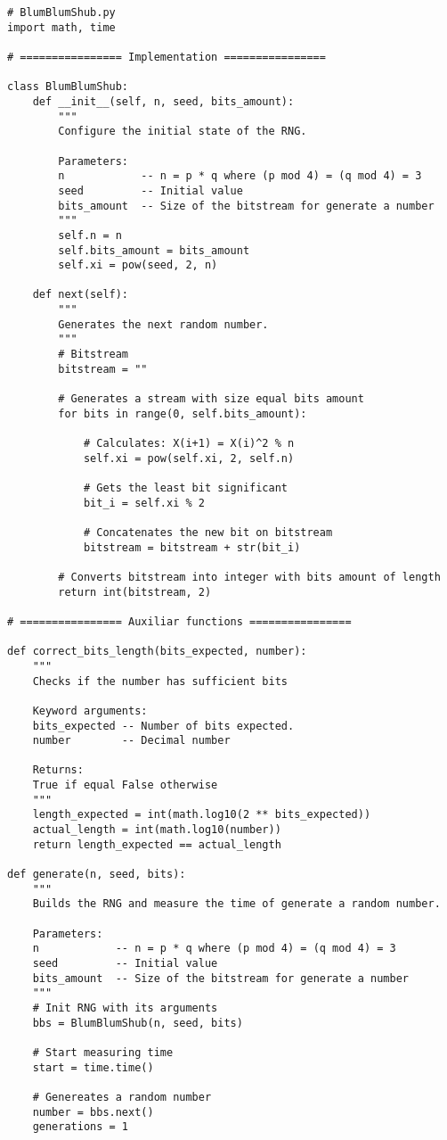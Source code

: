 \documentclass{article}
\begin{document}
\begin{lstlisting}
# BlumBlumShub.py
import math, time

# ================ Implementation ================

class BlumBlumShub:
	def __init__(self, n, seed, bits_amount):
		"""
		Configure the initial state of the RNG.

		Parameters:
		n            -- n = p * q where (p mod 4) = (q mod 4) = 3
		seed         -- Initial value
		bits_amount  -- Size of the bitstream for generate a number
		"""
		self.n = n
		self.bits_amount = bits_amount
		self.xi = pow(seed, 2, n)

	def next(self):
		"""
		Generates the next random number.
		"""
		# Bitstream
		bitstream = ""

		# Generates a stream with size equal bits amount
		for bits in range(0, self.bits_amount):

			# Calculates: X(i+1) = X(i)^2 % n
			self.xi = pow(self.xi, 2, self.n)

			# Gets the least bit significant
			bit_i = self.xi % 2

			# Concatenates the new bit on bitstream
			bitstream = bitstream + str(bit_i)
		
		# Converts bitstream into integer with bits amount of length
		return int(bitstream, 2)

# ================ Auxiliar functions ================

def correct_bits_length(bits_expected, number):
	"""
	Checks if the number has sufficient bits

	Keyword arguments:
	bits_expected -- Number of bits expected. 
	number        -- Decimal number

	Returns:
	True if equal False otherwise
	"""
	length_expected = int(math.log10(2 ** bits_expected))
	actual_length = int(math.log10(number))
	return length_expected == actual_length

def generate(n, seed, bits):
	"""
	Builds the RNG and measure the time of generate a random number.

	Parameters:
	n            -- n = p * q where (p mod 4) = (q mod 4) = 3
	seed         -- Initial value
	bits_amount  -- Size of the bitstream for generate a number
	"""
	# Init RNG with its arguments
	bbs = BlumBlumShub(n, seed, bits)

	# Start measuring time
	start = time.time()

	# Genereates a random number
	number = bbs.next()
	generations = 1


\end{lstlisting}
\end{document}
